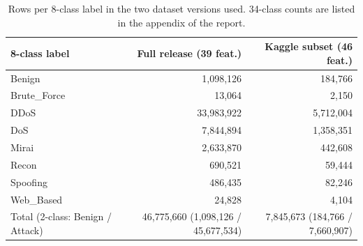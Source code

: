 \begin{table}[!t]
\centering
\caption{Rows per 8-class label in the two dataset versions used. 34-class counts are listed in the appendix of the report.}\label{tab:counts}
\scriptsize
\setlength{\tabcolsep}{3pt}
\begin{tabular}{lrr}
\toprule
\textbf{8-class label} & \textbf{Full release (39 feat.)} & \textbf{Kaggle subset (46 feat.)} \\
\midrule
Benign & 1,098,126 & 184,766 \\
Brute\_Force & 13,064 & 2,150 \\
DDoS & 33,983,922 & 5,712,004 \\
DoS & 7,844,894 & 1,358,351 \\
Mirai & 2,633,870 & 442,608 \\
Recon & 690,521 & 59,444 \\
Spoofing & 486,435 & 82,246 \\
Web\_Based & 24,828 & 4,104 \\
Total (2-class: Benign / Attack) & 46,775,660 (1,098,126 / 45,677,534) & 7,845,673 (184,766 / 7,660,907) \\
\bottomrule
\end{tabular}
\end{table}
